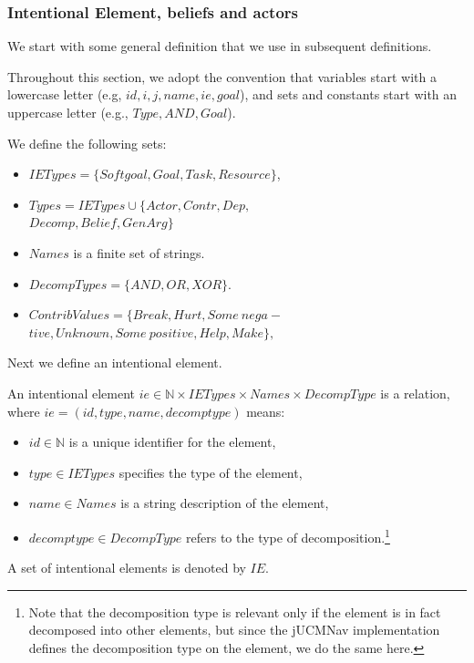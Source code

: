 \subsubsection{Intentional Element, beliefs and actors}

We start with some general definition that we use in subsequent definitions.

\begin{definition}
\label{def:set-definitions}
Throughout this section, we adopt the convention that variables start with a lowercase letter (e.g, $id, i, j, name, ie, goal$), and sets and constants start with an uppercase letter (e.g., $Type, AND, Goal$).

We define the following sets:
\begin{itemize}
\item $IETypes = \{Softgoal, Goal, Task, Resource\}$,
\item $Types = IETypes \cup \{Actor, Contr, Dep,$\\ \qquad $Decomp, Belief, GenArg\}$
\item $Names$ is a finite set of strings.
\item $DecompTypes = \{AND,OR,XOR\}$.
\item $ContribValues = \{Break, Hurt, Some\ nega-$ $tive, Unknown, Some\  positive, Help, Make\},$
\end{itemize}
\end{definition}

Next we define an intentional element.

\begin{definition}
\label{def:ie}
An intentional element $ie\in \mathbb{N}\times IETypes\times Names\times DecompType$ is a relation, where $ie = (id, type, name, decomptype)$ means:
\begin{itemize}
\item $id\in \mathbb{N}$ is a unique identifier for the element,
\item $type\in IETypes$ specifies the type of the element,
\item $name \in Names$ is a string description of the element,
\item $decomptype\in DecompType$ refers to the type of decomposition.\footnote{Note that the decomposition type is relevant only if the element is in fact decomposed into other elements, but since the jUCMNav implementation defines the decomposition type on the element, we do the same here.}
\end{itemize}
A set of intentional elements is denoted by $IE$.
\end{definition}

